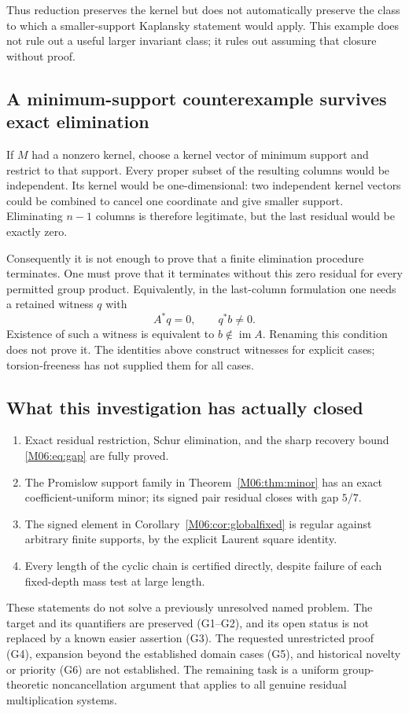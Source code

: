 \documentclass[11pt,a4paper,oneside]{report}
\theoremstyle{definition}
\theoremstyle{remark}
\DeclareMathOperator{\im}{im}
\begin{document}
Thus reduction preserves the kernel but does not automatically
preserve the class to which a smaller-support Kaplansky
statement would apply. This example does not rule out a useful
larger invariant class; it rules out assuming that closure
without proof.

\subsection{A minimum-support counterexample survives exact elimination}

If $M$ had a nonzero kernel, choose a kernel vector of minimum
support and restrict to that support. Every proper subset of
the resulting columns would be independent. Its kernel would
be one-dimensional: two independent kernel vectors could
be combined to cancel one coordinate and give smaller support.
Eliminating $n-1$ columns is therefore legitimate, but the
last residual would be exactly zero.

Consequently it is not enough to prove that a finite elimination
procedure terminates. One must prove that it terminates
without this zero residual for every permitted group product.
Equivalently, in the last-column formulation one needs a
retained witness $q$ with
\[
A^*q=0,\qquad q^*b\ne0.
\]
Existence of such a witness is equivalent to $b\notin\im A$.
Renaming this condition does not prove it. The identities
above construct witnesses for explicit cases; torsion-freeness
has not supplied them for all cases.

\subsection{What this investigation has actually closed}

\begin{enumerate}
\item Exact residual restriction, Schur elimination, and the
sharp recovery bound \eqref{M06:eq:gap} are fully proved.
\item The Promislow support family in Theorem~\ref{M06:thm:minor}
has an exact coefficient-uniform minor; its signed pair
residual closes with gap $5/7$.
\item The signed element in Corollary~\ref{M06:cor:globalfixed}
is regular against arbitrary finite supports, by the explicit
Laurent square identity.
\item Every length of the cyclic chain is certified directly,
despite failure of each fixed-depth mass test at large length.
\end{enumerate}
These statements do not solve a previously unresolved named
problem. The target and its quantifiers are preserved (G1--G2),
and its open status is not replaced by a known easier assertion
(G3). The requested unrestricted proof (G4), expansion beyond
the established domain cases (G5), and historical novelty or
priority (G6) are not established. The remaining task is a
uniform group-theoretic noncancellation argument that applies
to all genuine residual multiplication systems.
\end{document}
